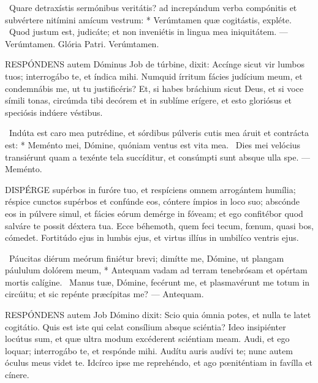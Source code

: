 \R\ Quare detraxístis sermónibus veritátis? ad increpándum verba compónitis et subvértere nitímini amícum vestrum: * Verúmtamen quæ cogitástis, expléte. \V\ Quod justum est, judicáte; et non inveniétis in lingua mea iniquitátem. — Verúmtamen. Glória Patri. Verúmtamen.




\lettrine[lines=2]{R}{ESPÓNDENS} autem Dóminus Job de túrbine, dixit: Accínge sicut vir lumbos tuos; interrogábo te, et índica mihi. Numquid írritum fácies judícium meum, et condemnábis me, ut tu justificéris? Et, si habes bráchium sicut Deus, et si voce símili tonas, circúmda tibi decórem et in sublíme erígere, et esto gloriósus et speciósis indúere véstibus.

\R\ Indúta est caro mea putrédine, et sórdibus púlveris cutis mea áruit et contrácta est: * Meménto mei, Dómine, quóniam ventus est vita mea. \V\ Dies mei velócius transiérunt quam a texénte tela succíditur, et consúmpti sunt absque ulla spe. — Meménto.


\lettrine[lines=2]{D}{ISPÉRGE} supérbos in furóre tuo, et respíciens omnem arrogántem humília; réspice cunctos supérbos et confúnde eos, cóntere ímpios in loco suo; abscónde eos in púlvere simul, et fácies eórum demérge in fóveam; et ego confitébor quod salváre te possit déxtera tua. Ecce béhemoth, quem feci tecum, fœnum, quasi bos, cómedet. Fortitúdo ejus in lumbis ejus, et virtus illíus in umbilíco ventris ejus.

\R\ Páucitas diérum meórum finiétur brevi; dimítte me, Dómine, ut plangam páululum dolórem meum, * Antequam vadam ad terram tenebrósam et opértam mortis calígine. \V\ Manus tuæ, Dómine, fecérunt me, et plasmavérunt me totum in circúitu; et sic repénte præcípitas me? — Antequam.



\lettrine[lines=2]{R}{ESPÓNDENS} autem Job Dómino dixit: Scio quia ómnia potes, et nulla te latet cogitátio. Quis est iste qui celat consílium absque sciéntia? Ideo insipiénter locútus sum, et quæ ultra modum excéderent sciéntiam meam. Audi, et ego loquar; interrogábo te, et respónde mihi. Audítu auris audívi te; nunc autem óculus meus videt te. Idcírco ipse me reprehéndo, et ago pœniténtiam in favílla et cínere.

